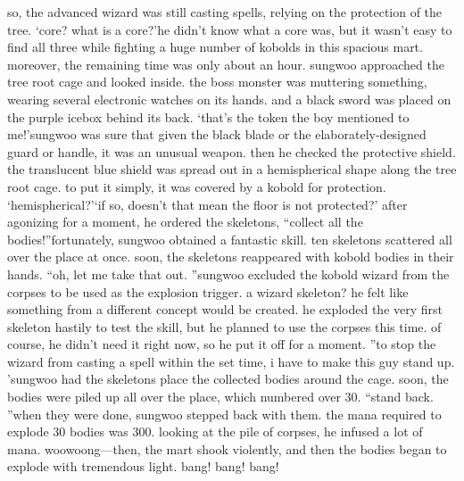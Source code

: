 so, the advanced wizard was still casting spells, relying on the protection of the tree.
‘core? what is a core?’he didn’t know what a core was, but it wasn’t easy to find all three while fighting a huge number of kobolds in this spacious mart.
 moreover, the remaining time was only about an hour.
 sungwoo approached the tree root cage and looked inside.
 the boss monster was muttering something, wearing several electronic watches on its hands.
 and a black sword was placed on the purple icebox behind its back.
‘that’s the token the boy mentioned to me!’sungwoo was sure that given the black blade or the elaborately-designed guard or handle, it was an unusual weapon.
 then he checked the protective shield.
 the translucent blue shield was spread out in a hemispherical shape along the tree root cage.
 to put it simply, it was covered by a kobold for protection.
‘hemispherical?’‘if so, doesn’t that mean the floor is not protected?’ after agonizing for a moment, he ordered the skeletons, “collect all the bodies!”fortunately, sungwoo obtained a fantastic skill.
 ten skeletons scattered all over the place at once.
 soon, the skeletons reappeared with kobold bodies in their hands.
“oh, let me take that out.
”sungwoo excluded the kobold wizard from the corpses to be used as the explosion trigger.
a wizard skeleton? he felt like something from a different concept would be created.
he exploded the very first skeleton hastily to test the skill, but he planned to use the corpses this time.
 of course, he didn’t need it right now, so he put it off for a moment.
”to stop the wizard from casting a spell within the set time, i have to make this guy stand up.
’sungwoo had the skeletons place the collected bodies around the cage.
soon, the bodies were piled up all over the place, which numbered over 30.
“stand back.
”when they were done, sungwoo stepped back with them.
 the mana required to explode 30 bodies was 300.
 looking at the pile of corpses, he infused a lot of mana.
woowoong—then, the mart shook violently, and then the bodies began to explode with tremendous light.
bang! bang! bang!

 
